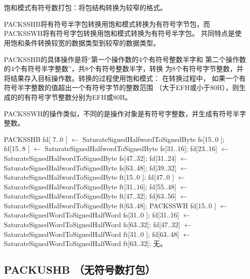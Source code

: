 \begin{instructionblk}
   \\
   \\
  {饱和模式有符号数打包：将包结构转换为较窄的格式。}
  {PACKSSHB将有符号半字包转换用饱和模式转换为有符号字节包，而
  PACKSSWH将有符号字包转换用饱和模式转换为有符号半字包。
  共同特点是使用饱和条件转换较宽的数据类型到较窄的数据类型。

  PACKSSHB的具体操作是将``第一个操作数的4个有符号整数半字和
  第二个操作数的4个有符号半字整数''，共8个有符号整数半字，转换
  为8个有符号字节整数，并将结果存入目标操作数。转换的过程使用饱和模式：
  在转换过程中， 如果一个有符号半字整数的值超出一个有符号字节的整数范围
  （大于EFH或小于80H），则生成的的有符号字节整数分别为EFH或80H。
  
  PACKSSWH的操作类似，不同的是操作对象是有符号字整数，并生成有符号半字整数。}
  {PACKSSHB \narrownewline
  fd[ 7..0 ] $\leftarrow$ SaturateSignedHalfwordToSignedByte fs[15..0 ]; \narrownewline
  fd[15..8 ] $\leftarrow$ SaturateSignedHalfwordToSignedByte fs[31..16]; \narrownewline
  fd[23..16] $\leftarrow$ SaturateSignedHalfwordToSignedByte fs[47..32]; \narrownewline
  fd[31..24] $\leftarrow$ SaturateSignedHalfwordToSignedByte fs[63..48]; \narrownewline
  fd[39..32] $\leftarrow$ SaturateSignedHalfwordToSignedByte ft[15..0 ]; \narrownewline
  fd[47..0 ] $\leftarrow$ SaturateSignedHalfwordToSignedByte ft[31..16]; \narrownewline
  fd[55..48] $\leftarrow$ SaturateSignedHalfwordToSignedByte ft[47..32]; \narrownewline
  fd[63..56] $\leftarrow$ SaturateSignedHalfwordToSignedByte ft[63..48]; \narrownewline \narrownewline
  PACKSSWH \narrownewline
  fd[15..0 ] $\leftarrow$  SaturateSignedWordToSignedHalfWord fs[31..0 ]; \narrownewline
  fd[31..16] $\leftarrow$  SaturateSignedWordToSignedHalfWord fs[63..32]; \narrownewline
  fd[47..32] $\leftarrow$  SaturateSignedWordToSignedHalfWord ft[31..0 ]; \narrownewline
  fd[63..48] $\leftarrow$  SaturateSignedWordToSignedHalfWord ft[63..32];}
  {无。}
\end{instructionblk}


\subsection{PACKUSHB （无符号数打包）}

